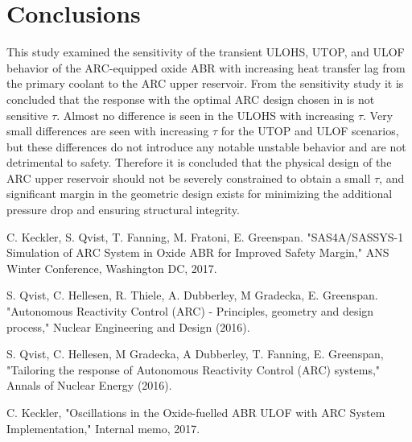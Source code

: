 \documentclass[11pt, oneside]{article}   	%
\begin{document}
\section{Conclusions}
This study examined the sensitivity of the transient ULOHS, UTOP, and ULOF behavior of the ARC-equipped oxide ABR with increasing heat transfer lag from the primary coolant to the ARC upper reservoir.
From the sensitivity study it is concluded that the response with the optimal ARC design chosen in \cite{2017ANSWinter_ARC} is not sensitive $\tau$.
Almost no difference is seen in the ULOHS with increasing $\tau$.
Very small differences are seen with increasing $\tau$ for the UTOP and ULOF scenarios, but these differences do not introduce any notable unstable behavior and are not detrimental to safety.
Therefore it is concluded that the physical design of the ARC upper reservoir should not be severely constrained to obtain a small $\tau$, and significant margin in the geometric design exists for minimizing the additional pressure drop and ensuring structural integrity.

\begin{thebibliography}{9}

C. Keckler, S. Qvist, T. Fanning, M. Fratoni, E. Greenspan. "SAS4A/SASSYS-1 Simulation of ARC System in Oxide ABR for Improved Safety Margin," ANS Winter Conference, Washington DC, 2017.

S. Qvist, C. Hellesen, R. Thiele, A. Dubberley, M Gradecka, E. Greenspan. "Autonomous Reactivity Control (ARC) - Principles, geometry and design process," Nuclear Engineering and Design (2016).

S. Qvist, C. Hellesen, M Gradecka, A Dubberley, T. Fanning, E. Greenspan, "Tailoring the response of Autonomous Reactivity Control (ARC) systems," Annals of Nuclear Energy (2016).

C. Keckler, "Oscillations in the Oxide-fuelled ABR ULOF with ARC System Implementation," Internal memo, 2017.

\end{thebibliography}
\end{document}
